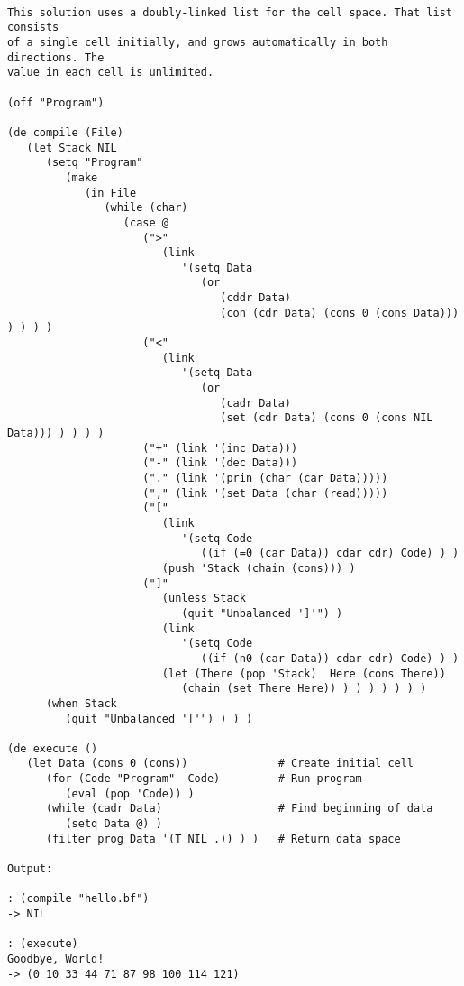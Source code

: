 \begin{verbatim}

This solution uses a doubly-linked list for the cell space. That list consists
of a single cell initially, and grows automatically in both directions. The
value in each cell is unlimited.

(off "Program")

(de compile (File)
   (let Stack NIL
      (setq "Program"
         (make
            (in File
               (while (char)
                  (case @
                     (">"
                        (link
                           '(setq Data
                              (or
                                 (cddr Data)
                                 (con (cdr Data) (cons 0 (cons Data))) ) ) ) )
                     ("<"
                        (link
                           '(setq Data
                              (or
                                 (cadr Data)
                                 (set (cdr Data) (cons 0 (cons NIL Data))) ) ) ) )
                     ("+" (link '(inc Data)))
                     ("-" (link '(dec Data)))
                     ("." (link '(prin (char (car Data)))))
                     ("," (link '(set Data (char (read)))))
                     ("["
                        (link
                           '(setq Code
                              ((if (=0 (car Data)) cdar cdr) Code) ) )
                        (push 'Stack (chain (cons))) )
                     ("]"
                        (unless Stack
                           (quit "Unbalanced ']'") )
                        (link
                           '(setq Code
                              ((if (n0 (car Data)) cdar cdr) Code) ) )
                        (let (There (pop 'Stack)  Here (cons There))
                           (chain (set There Here)) ) ) ) ) ) ) )
      (when Stack
         (quit "Unbalanced '['") ) ) )

(de execute ()
   (let Data (cons 0 (cons))              # Create initial cell
      (for (Code "Program"  Code)         # Run program
         (eval (pop 'Code)) )
      (while (cadr Data)                  # Find beginning of data
         (setq Data @) )
      (filter prog Data '(T NIL .)) ) )   # Return data space

Output:

: (compile "hello.bf")
-> NIL

: (execute)
Goodbye, World!
-> (0 10 33 44 71 87 98 100 114 121)

\end{verbatim}

